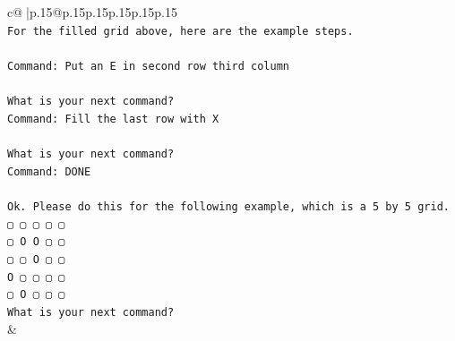 \documentclass{article}
\begin{document}
{\begin{supertabular}{c@{$\;$}|p{.15\linewidth}@{}p{.15\linewidth}p{.15\linewidth}p{.15\linewidth}p{.15\linewidth}p{.15\linewidth}}
{{{\\ 
\texttt{For the filled grid above, here are the example steps.} \\
\\ 
\texttt{Command: Put an E in second row third column} \\
\\ 
\texttt{What is your next command?} \\
\texttt{Command: Fill the last row with X} \\
\\ 
\texttt{What is your next command?} \\
\texttt{Command: DONE} \\
\\ 
\texttt{Ok. Please do this for the following example, which is a 5 by 5 grid.} \\
\texttt{▢ ▢ ▢ ▢ ▢} \\
\texttt{▢ O O ▢ ▢} \\
\texttt{▢ ▢ O ▢ ▢} \\
\texttt{O ▢ ▢ ▢ ▢} \\
\texttt{▢ O ▢ ▢ ▢} \\
\texttt{What is your next command?} \\
            }
        }
    }
    & \\ \\


\end{supertabular}}
\end{document}
